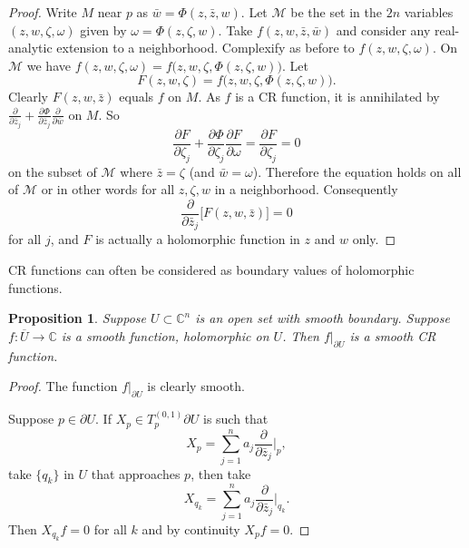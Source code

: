 \documentclass[12pt,openany]{book}
\newcommand{\C}{{\mathbb{C}}}
\newcommand{\sM}{{\mathscr{M}}}
\theoremstyle{plain}
\newtheorem{prop}[thm]{Proposition}
\theoremstyle{remark}
\theoremstyle{definition}
\theoremstyle{exercise}
\theoremstyle{example}
\begin{document}
\begin{proof}
Write $M$ near $p$ as $\bar{w} = \Phi(z,\bar{z},w)$.
Let $\sM$ be the set in the $2n$ variables $(z,w,\zeta,\omega)$ given by
$\omega = \Phi(z,\zeta,w)$.
Take $f(z,w,\bar{z},\bar{w})$ and consider any real-analytic extension
to a neighborhood.  Complexify as before to
$f(z,w,\zeta,\omega)$.  On $\sM$ we have
$f(z,w,\zeta,\omega) = f\bigl(z,w,\zeta,\Phi(z,\zeta,w)\bigr)$.  Let
\begin{equation*}
F(z,w,\zeta) = f\bigl(z,w,\zeta,\Phi(z,\zeta,w)\bigr).
\end{equation*}
Clearly $F(z,w,\bar{z})$ equals $f$ on $M$.  
As $f$ is a CR function, it is annihilated by
$\frac{\partial}{\partial \bar{z}_j}
+\frac{\partial \Phi}{\partial \bar{z}_j} \frac{\partial}{\partial
\bar{w}}$ on $M$.  So
\begin{equation*}
\frac{\partial F}{\partial \zeta_j}
+\frac{\partial \Phi}{\partial \zeta_j} \frac{\partial F}{\partial
\omega}
=
\frac{\partial F}{\partial \zeta_j} = 0
\end{equation*}
on the subset of $\sM$ where $\bar{z} = \zeta$ (and $\bar{w}=\omega$).
Therefore the equation holds on all of $\sM$ or in other words for
all $z,\zeta,w$ in a neighborhood.  Consequently
\begin{equation*}
\frac{\partial}{\partial \bar{z}_j} \bigl[ F(z,w,\bar{z}) \bigr] = 0
\end{equation*}
for all $j$,
and $F$ is actually a holomorphic function in $z$ and $w$ only.
\end{proof}

CR functions can often be considered as boundary values of
holomorphic functions.

\begin{prop}
Suppose $U \subset \C^n$ is an open set with smooth boundary.  Suppose
$f \colon \overline{U} \to \C$ is a smooth function, holomorphic on $U$.
Then $f|_{\partial U}$ is a smooth CR function.
\end{prop}

\begin{proof}
The function $f|_{\partial U}$ is clearly smooth.

Suppose $p \in \partial U$.
If $X_p \in T_p^{(0,1)} \partial U$ is such that
\begin{equation*}
X_p = \sum_{j=1}^n a_j \frac{\partial}{\partial \bar{z}_j} \Big|_p ,
\end{equation*}
take $\{ q_k \}$ in $U$ that approaches $p$, then take
\begin{equation*}
X_{q_k} = \sum_{j=1}^n a_j \frac{\partial}{\partial \bar{z}_j} \Big|_{q_k} .
\end{equation*}
Then $X_{q_k} f = 0$ for all $k$ and by continuity $X_p f = 0$.
\end{proof}
\end{document}
